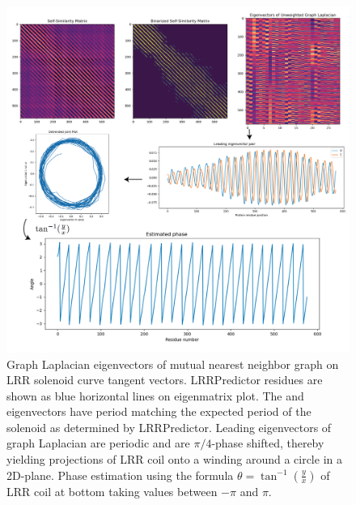 \documentclass[authoryear]{article}
\begin{document}
\begin{figure}[h!]
 \centering
 \includegraphics[width=1.2\textwidth]{eig.png}
 \caption{Graph Laplacian eigenvectors of mutual nearest neighbor graph on LRR solenoid curve tangent vectors. LRRPredictor residues are shown as blue horizontal lines on eigenmatrix plot. The  and  eigenvectors have period matching the expected period of the solenoid as determined by LRRPredictor. Leading eigenvectors of graph Laplacian are periodic and are $\pi/4$-phase shifted, thereby yielding projections of LRR coil onto a winding around a circle in a 2D-plane. Phase estimation using the formula $\theta = \tan^{-1}(\frac{y}{x})$ of LRR coil at bottom taking values between $-\pi$ and $\pi$. }
 \label{fig:graphlap}
\end{figure}

\end{document}
